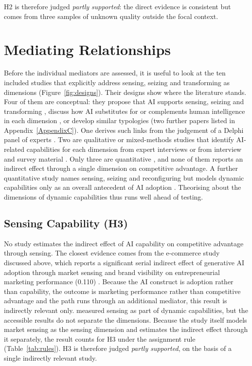 H2 is therefore judged \textit{partly supported}: the direct evidence is consistent but comes from three samples of unknown quality outside the focal context.

\section{Mediating Relationships}
\label{sec:mediating}

Before the individual mediators are assessed, it is useful to look at the ten included studies that explicitly address sensing, seizing and transforming as dimensions (Figure~\ref{fig:designs}). Their designs show where the literature stands. Four of them are conceptual: they propose that AI supports sensing, seizing and transforming \parencite{karami2026}, discuss how AI substitutes for or complements human intelligence in each dimension \parencite{siaw2024}, or develop similar typologies (two further papers listed in Appendix~\ref{AppendixC}). One derives such links from the judgement of a Delphi panel of experts \parencite{ghobakhloo2025}. Two are qualitative or mixed-methods studies that identify AI-related capabilities for each dimension from expert interviews \parencite{feroz2024} or from interview and survey material \parencite{maune2026}. Only three are quantitative \parencite{fano2025, neirafernandez2026, noor2026}, and none of them reports an indirect effect through a single dimension on competitive advantage. A further quantitative study names sensing, seizing and reconfiguring but models dynamic capabilities only as an overall antecedent of AI adoption \parencite{deng2025}. Theorising about the dimensions of dynamic capabilities thus runs well ahead of testing.

\subsection{Sensing Capability (H3)}
\label{sec:h3}

No study estimates the indirect effect of AI capability on competitive advantage through sensing. The closest evidence comes from the e-commerce study discussed above, which reports a significant serial indirect effect of generative AI adoption through market sensing and brand visibility on entrepreneurial marketing performance (0.110) \parencite{noor2026}. Because the AI construct is adoption rather than capability, the outcome is marketing performance rather than competitive advantage and the path runs through an additional mediator, this result is indirectly relevant only. \textcite{fano2025} measured sensing as part of dynamic capabilities, but the accessible results do not separate the dimensions. Because the study itself models market sensing as the sensing dimension and estimates the indirect effect through it separately, the result counts for H3 under the assignment rule (Table~\ref{tab:rules}). H3 is therefore judged \textit{partly supported}, on the basis of a single indirectly relevant study.

